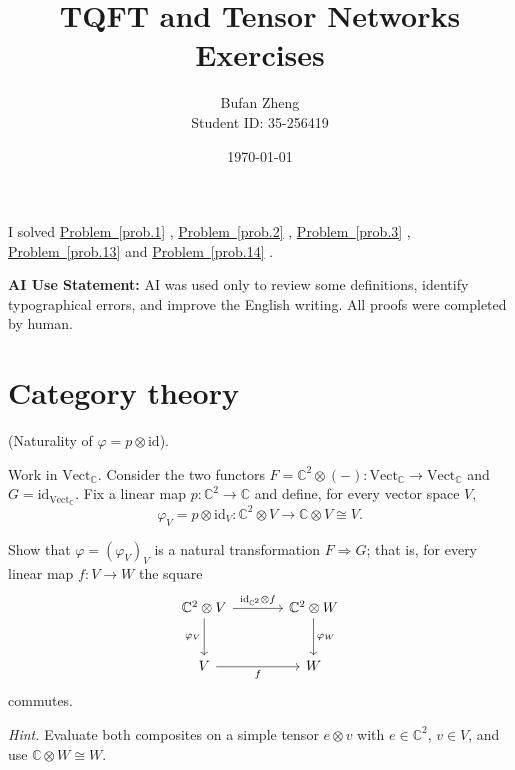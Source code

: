\documentclass[11pt,a4paper]{article}
\title{\textbf{TQFT and Tensor Networks}\\[0.4em]
	\large Exercises}
\author{Bufan Zheng\\[0.2em]\normalsize Student ID: 35-256419}
\date{\today}
\newcounter{problem}
\newcommand{\problemref}[1]{%
	\hyperref[#1]{Problem~\ref*{#1}}%
}
\begin{document}
	
	\maketitle
	
	I solved \problemref{prob.1}, \problemref{prob.2},
	\problemref{prob.3}, \problemref{prob.13} and
	\problemref{prob.14}.
	
	\textbf{AI Use Statement:} AI was used only to review some definitions, identify typographical errors, and improve the English writing. All proofs were completed by human.
	
	\section{Category theory}
	
	\begin{problembox}[1]
		\label{prob.1}
		(Naturality of $\varphi=p\otimes\mathrm{id}$).
		
		Work in $\mathrm{Vect}_{\mathbb{C}}$. Consider the two functors
		$F=\mathbb{C}^{2}\otimes(-):\mathrm{Vect}_{\mathbb{C}}
		\to\mathrm{Vect}_{\mathbb{C}}$
		and $G=\mathrm{id}_{\mathrm{Vect}_{\mathbb{C}}}$.
		Fix a linear map $p:\mathbb{C}^{2}\to\mathbb{C}$ and define,
		for every vector space $V$,
		\[
		\varphi_V
		=
		p\otimes\mathrm{id}_V:
		\mathbb{C}^{2}\otimes V
		\longrightarrow
		\mathbb{C}\otimes V
		\cong V.
		\]
		
		Show that $\varphi=(\varphi_V)_V$ is a natural transformation
		$F\Rightarrow G$; that is, for every linear map $f:V\to W$ the square
		\[
		\begin{tikzcd}[column sep=large,row sep=large]
			\mathbb{C}^{2}\otimes V
			\arrow[r,"\mathrm{id}_{\mathbb{C}^{2}}\otimes f"]
			\arrow[d,"\varphi_V"']
			&
			\mathbb{C}^{2}\otimes W
			\arrow[d,"\varphi_W"]
			\\
			V
			\arrow[r,"f"']
			&
			W
		\end{tikzcd}
		\]
		commutes.
		
		\textit{Hint.} Evaluate both composites on a simple tensor
		$e\otimes v$ with $e\in\mathbb{C}^{2}$, $v\in V$, and use
		$\mathbb{C}\otimes W\cong W$.
	\end{problembox}
\end{document}
